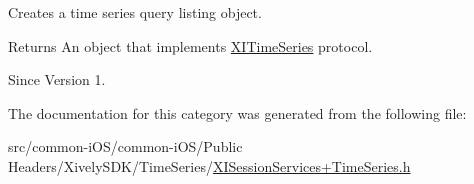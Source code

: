 Creates a time series query listing object. 

\begin{DoxyReturn}{Returns}
An object that implements \hyperlink{}{X\+I\+Time\+Series} protocol. 
\end{DoxyReturn}
\begin{DoxySince}{Since}
Version 1. 
\end{DoxySince}


The documentation for this category was generated from the following file\+:\begin{DoxyCompactItemize}
\item 
src/common-\/i\+O\+S/common-\/i\+O\+S/\+Public Headers/\+Xively\+S\+D\+K/\+Time\+Series/\hyperlink{_x_i_session_services_09_time_series_8h}{X\+I\+Session\+Services+\+Time\+Series.\+h}\end{DoxyCompactItemize}
